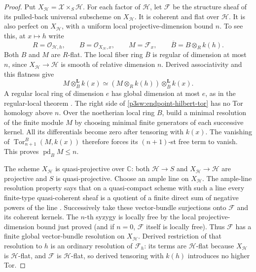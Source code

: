 \documentclass[11pt]{article}
\newcommand{\C}{\mathbb C}
\numberwithin{equation}{section}
\begin{document}
\begin{proof}
Put \(X_{\mathscr H}=\mathcal X\times_S\mathscr H\).
For each factor of \(\mathscr H\), let \(\mathcal F\) be the
structure sheaf of its pulled-back universal subscheme on
\(X_{\mathscr H}\).  It is coherent and flat over \(\mathscr H\).
It is also perfect on \(X_{\mathscr H}\), with a uniform local
projective-dimension bound \(n\).  To see this, at \(x\mapsto h\)
write
\[
 R=\mathcal O_{\mathscr H,h},\qquad
 B=\mathcal O_{X_{\mathscr H},x},\qquad
 M=\mathcal F_x,\qquad \overline B=B\otimes_R k(h).
\]
Both \(B\) and \(M\) are \(R\)-flat.  The local fiber ring
\(\overline B\) is regular of dimension at most \(n\), since
\(X_{\mathscr H}\to\mathscr H\) is smooth of relative dimension
\(n\).  Derived associativity and this flatness give
\begin{equation}
\label{p3sw:endpoint-hilbert-tor}
 M\otimes_B^{\mathbf L}k(x)
   \simeq (M\otimes_R k(h))
                \otimes_{\overline B}^{\mathbf L}k(x).
\end{equation}
A regular local ring of dimension \(e\) has global dimension at
most \(e\), as in the regular-local theorem
\cite[Tag~00O7, Proposition~10.110.1]{P3SWStacks}.
The right side of \eqref{p3sw:endpoint-hilbert-tor} has no Tor
homology above \(n\).  Over the noetherian local ring \(B\), build
a minimal resolution of the finite module \(M\) by choosing
minimal finite generators of each successive kernel.  All its
differentials become zero after tensoring with \(k(x)\).  The
vanishing of \(\operatorname{Tor}_{n+1}^B(M,k(x))\) therefore
forces its \((n+1)\)-st free term to vanish.  This proves
\(\operatorname{pd}_B M\leq n\).

The scheme \(X_{\mathscr H}\) is quasi-projective over \(\C\):
both \(\mathscr H\to S\) and \(X_{\mathscr H}\to\mathscr H\)
are projective and \(S\) is quasi-projective.  Choose an ample
line on \(X_{\mathscr H}\).  The ample-line resolution property
says that on a quasi-compact scheme with such a line every
finite-type quasi-coherent sheaf is a quotient of a finite direct
sum of negative powers of the line
\cite[Tag~01Q3, Proposition~28.27.13(8)]{P3SWStacks}.
Successively take these vector-bundle surjections onto
\(\mathcal F\) and its coherent kernels.  The \(n\)-th syzygy is
locally free by the local projective-dimension bound just proved
(and if \(n=0\), \(\mathcal F\) itself is locally free).
Thus \(\mathcal F\) has a finite global vector-bundle resolution
on \(X_{\mathscr H}\).  Derived restriction of that resolution
to \(h\) is an ordinary resolution of \(\mathcal F_h\): its
terms are \(\mathscr H\)-flat because \(X_{\mathscr H}\) is
\(\mathscr H\)-flat, and \(\mathcal F\) is \(\mathscr H\)-flat,
so derived tensoring with \(k(h)\) introduces no higher Tor.


\end{proof}
\end{document}

